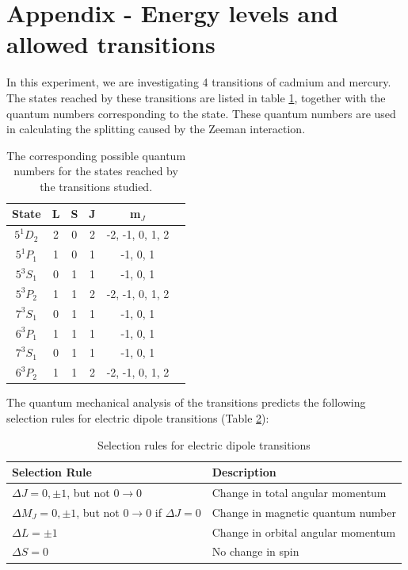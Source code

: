 \documentclass[11pt]{article}
\begin{document}
\section{Appendix - Energy levels and allowed transitions} \label{sec: theory derivation}
In this experiment, we are investigating 4 transitions of cadmium and mercury. The states reached by these transitions are listed in table \ref{tab: quantum_numbers}, together with the quantum numbers corresponding to the state. These quantum numbers are used in calculating the splitting caused by the Zeeman interaction. 
\begin{table}[h!]
    \centering
    \begin{tabular}{cccccc}
        \toprule
        \textbf{State} & \textbf{L} & \textbf{S} & \textbf{J} & \textbf{m$_J$} \\
        \midrule
        $5^1 D_2$ & 2 & 0 & 2 & -2, -1, 0, 1, 2 \\
        $5^1 P_1$ & 1 & 0 & 1 & -1, 0, 1 \\
        $5^3 S_1$ & 0 & 1 & 1 & -1, 0, 1 \\
        $5^3 P_2$ & 1 & 1 & 2 & -2, -1, 0, 1, 2 \\
        $7^3 S_1$ & 0 & 1 & 1 & -1, 0, 1 \\
        $6^3 P_1$ & 1 & 1 & 1 & -1, 0, 1 \\
        $7^3 S_1$ & 0 & 1 & 1 & -1, 0, 1 \\
        $6^3 P_2$ & 1 & 1 & 2 & -2, -1, 0, 1, 2 \\
        \bottomrule
    \end{tabular}
    \captionsetup{justification=centering}
    \caption{The corresponding possible quantum numbers for the states reached by the transitions studied.}
    \label{tab: quantum_numbers}
\end{table}

The quantum mechanical analysis of the transitions predicts the following selection rules for electric dipole transitions (Table \ref{tab:selection_rules}): 
\begin{table}[h!]
    \centering
    \begin{tabular}{ll}
        \toprule
        Selection Rule & Description \\
        \midrule
        $\Delta J = 0, \pm 1$, but not $0 \rightarrow 0$ & Change in total angular momentum \\
        $\Delta M_J = 0, \pm 1$, but not $0 \rightarrow 0$ if $\Delta J = 0$ & Change in magnetic quantum number \\
        $\Delta L = \pm 1$ & Change in orbital angular momentum \\
        $\Delta S = 0$ & No change in spin \\
        \bottomrule
    \end{tabular}
    \caption{Selection rules for electric dipole transitions}
    \label{tab:selection_rules}
\end{table}
\end{document}
